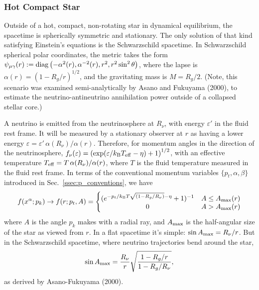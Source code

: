 \subsubsection{Hot Compact Star}
\label{sssc:f_af_sphere}
Outside of a hot, compact, non-rotating star in dynamical equilibrium, the
spacetime is spherically symmetric and stationary. The only solution of that
kind satisfying Einstein's equations is the Schwarzschild spacetime.
In Schwarzschild spherical polar coordinates, the metric takes the form
$\psi_{\mu\gamma}(r):={\rm diag}\left(-\alpha^2(r),\alpha^{-2}(r),r^2,r^2\sin^2\theta\right)$,
where the lapse is $\alpha(r)=(1-R_g/r)^{1/2}$, and the gravitating mass is
$M=R_g/2$.
(Note, this scenario was examined semi-analytically by Asano and Fukuyama (2000),
to estimate the neutrino-antineutrino annihilation power outside of a collapsed
stellar core.)

A neutrino is emitted from the neutrinosphere at $R_\nu$, with energy
$\varepsilon'$ in the fluid rest frame.
It will be measured by a stationary observer at $r$
as having a lower energy
$\varepsilon=\varepsilon' \, \alpha(R_\nu)/\alpha(r)$.
Therefore, for momentum angles in the direction of the neutrinosphere,
$f_\nu(\varepsilon)=\left(\exp(\varepsilon/k_{\rm B}T_{\rm eff}-\eta)+1\right)^{1/2}$,
with an effective temperature $T_{\rm eff}=T \, \alpha(R_\nu)/\alpha(r)$,
where $T$ is the fluid temperature measured in the fluid rest frame.
In terms of the conventional momentum variables $\{p_t,\alpha,\beta\}$
introduced in Sec.~\ref{ssec:p_conventions}, we have
\begin{equation}
  \label{eqn:asano_fukuyama_f}
  f(x^\alpha;p_k) \rightarrow f(r;p_t,A)
  =\left\{
  \begin{matrix}
    (e^{-p_t/k_{\rm B}T\sqrt{(1-R_g/R_\nu)}-\eta}+1)^{-1} & A \leq A_{\rm max}(r) \\
    0                                                            & A > A_{\rm max}(r)
  \end{matrix}
  \right.
\end{equation}
where $A$ is the angle $p_k$ makes with a radial ray, and
$A_{\rm max}$ is the half-angular size of the star as viewed from $r$.
In a flat spacetime it's simple: $\sin A_{\rm max} = R_\nu/r$.
But in the Schwarzschild spacetime, where neutrino trajectories bend around the
star,
\begin{equation}
  \label{eqn:angular_extent}
  \sin A_{\rm max} = \frac{R_\nu}{r} \sqrt{\frac{1-R_g/r}{1-R_g/R_\nu}},
\end{equation}
as derived by Asano-Fukuyama (2000).

